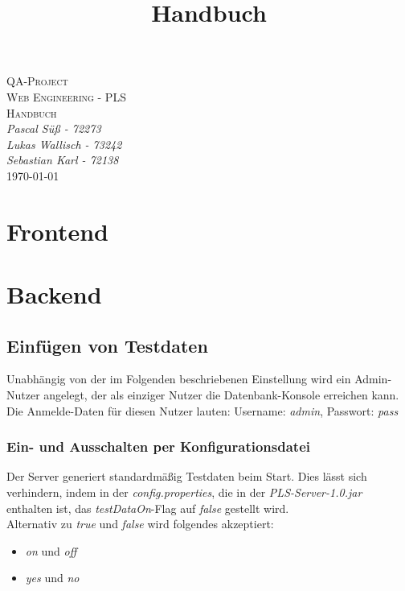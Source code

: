 \documentclass[a4paper]{report}
\begin{document}
\begin{titlepage}
	\centering
	{\scshape\Huge QA-Project}
	\vspace{1cm} \\
	{\scshape\LARGE Web Engineering - PLS}
	\vspace{1cm} \\
	{\scshape\LARGE Handbuch}
	\vspace{1cm} \\
	{\large\itshape Pascal Süß - 72273} \\
	\vspace{0.5cm}
	{\large\itshape Lukas Wallisch - 73242} \\ 
	\vspace{0.5cm}
	{\large\itshape Sebastian Karl - 72138} \\ 
	\vfill
	{\large \today}
\end{titlepage}
\title{Handbuch}

\tableofcontents

\part{Frontend}

\part{Backend}
\chapter{Einfügen von Testdaten}
\label{admin}
Unabhängig von der im Folgenden beschriebenen Einstellung wird ein Admin-Nutzer angelegt, der als einziger Nutzer die Datenbank-Konsole erreichen kann. Die Anmelde-Daten für diesen Nutzer lauten: Username: \textit{admin}, Passwort: \textit{pass}
\section{Ein- und Ausschalten per Konfigurationsdatei}
Der Server generiert standardmäßig Testdaten beim Start. Dies lässt sich verhindern, indem in der \textit{config.properties}, die in der \textit{PLS-Server-1.0.jar} enthalten ist, das \textit{testDataOn}-Flag auf \textit{false} gestellt wird.\\
Alternativ zu \textit{true} und \textit{false} wird folgendes akzeptiert:
\begin{itemize}
	\item \textit{on} und \textit{off}
	\item \textit{yes} und \textit{no}
\end{itemize}
\end{document}
